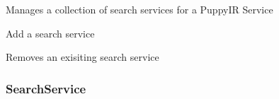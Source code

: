 \documentclass[letterpaper,10pt,english]{sphinxmanual}
\begin{document}
\begin{fulllineitems}
\label{api3.0:puppy.service.ServiceManager}
Manages a collection of search services for a PuppyIR Service

\begin{fulllineitems}
\label{api3.0:puppy.service.ServiceManager.add_search_service}
Add a search service

\end{fulllineitems}


\begin{fulllineitems}
\label{api3.0:puppy.service.ServiceManager.remove_search_service}
Removes an exisiting search service

\end{fulllineitems}


\end{fulllineitems}



\subsubsection{SearchService}
\label{api3.0:searchservice}
\end{document}
